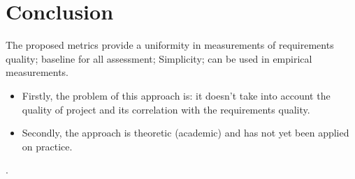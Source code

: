 \section{Conclusion}
\label{sec:conclusion}

 The proposed metrics provide a uniformity in measurements of requirements quality; baseline for all assessment; Simplicity; can be used in empirical measurements.
\begin{itemize}
	\item  Firstly,  the problem of this approach is: it doesn't take into account the quality of project and its correlation with the requirements quality.
\item Secondly, the approach is theoretic (academic) and has not yet been applied on practice.
\end{itemize}
.